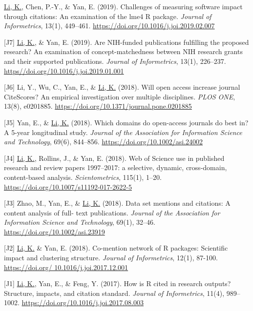 \documentclass[margin, 10pt]{res} %
\begin{document}
\begin{resume}
[J8] \underline{Li, K.}, Chen, P.-Y., \& Yan, E. (2019). Challenges of measuring software impact through citations: An examination of the lme4 R package. \textit{Journal of Informetrics}, 13(1), 449–461. \href{https://doi.org/10.1016/j.joi.2019.02.007}{https://doi.org/10.1016/j.joi.2019.02.007}

[J7] \underline{Li, K.}, \& Yan, E. (2019). Are NIH-funded publications fulfilling the proposed research? An examination of concept-matchedness between NIH research grants and their supported publications. \textit{Journal of Informetrics}, 13(1), 226–237. \href{https//doi.org/10.1016/j.joi.2019.01.001}{https//doi.org/10.1016/j.joi.2019.01.001}

[J6] Li, Y., Wu, C., Yan, E., \& \underline{Li, K.} (2018). Will open access increase journal CiteScores? An empirical investigation over multiple disciplines. \textit{PLOS ONE}, 13(8), e0201885. \href{https://doi.org/10.1371/journal.pone.0201885}{https://doi.org/10.1371/journal.pone.0201885}

[J5] Yan, E., \& \underline{Li, K.} (2018). Which domains do open-access journals do best in? A 5-year longitudinal study. \textit{Journal of the Association for Information Science and Technology}, 69(6), 844–856. \href{https://doi.org/10.1002/asi.24002}{https://doi.org/10.1002/asi.24002}

[J4] \underline{Li, K.}, Rollins, J., \& Yan, E. (2018). Web of Science use in published research and review papers 1997–2017: a selective, dynamic, cross-domain, content-based analysis. \textit{Scientometrics}, 115(1), 1–20. \href{https://doi.org/10.1007/s11192-017-2622-5}{https://doi.org/10.1007/s11192-017-2622-5}

[J3] Zhao, M., Yan, E., \& \underline{Li, K.} (2018). Data set mentions and citations: A content analysis of full- text publications. \textit{Journal of the Association for Information Science and Technology}, 69(1), 32–46. \href{https://doi.org/10.1002/asi.23919}{https://doi.org/10.1002/asi.23919}

[J2] \underline{Li, K.} \& Yan, E. (2018). Co-mention network of R packages: Scientific impact and clustering structure. \textit{Journal of Informetrics}, 12(1), 87-100. \href{https://doi.org/10.1016/j.joi.2017.12.001}{https://doi.org/ 10.1016/j.joi.2017.12.001}

[J1] \underline{Li, K.}, Yan, E., \& Feng, Y. (2017). How is R cited in research outputs? Structure, impacts, and citation standard. \textit{Journal of Informetrics}, 11(4), 989–1002. \href{https://doi.org/10.1016/j.joi.2017.08.003}{https://doi.org/10.1016/j.joi.2017.08.003}


\end{resume}
\end{document}
